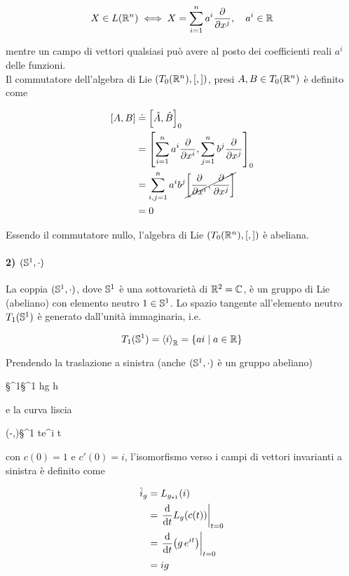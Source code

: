 \begin{equation}
	X \in L(\R^{n}) \iff X = \sum_{i=1}^{n} a^{i} \pdv{x^{j}} \qcomma a^{i} \in \R
\end{equation}

mentre un campo di vettori qualsiasi può avere al posto dei coefficienti reali $ a^{i} $ delle funzioni.\\
Il commutatore dell'algebra di Lie $ (T_{0}(\R^{n}),[,]) $, presi $ A,B \in T_{0}(\R^{n}) $ è definito come

\begin{align}
	\begin{split}
		\comm{A}{B} &\doteq \comm{\hat{A}}{\hat{B}}_{0}\\
		&= \comm{ \sum_{i=1}^{n} a^{i} \pdv{x^{i}} }{ \sum_{j=1}^{n} b^{j} \pdv{x^{j}} }_{0}\\
		&= \sum_{i,j=1}^{n} a^{i} b^{j} \cancel{ \comm{ \pdv{x^{i}} }{ \pdv{x^{j}} } }\\
		&= 0
	\end{split}
\end{align}

Essendo il commutatore nullo, l'algebra di Lie $ (T_{0}(\R^{n}),[,]) $ è abeliana.

\paragraph{2) $ (\S^{1},\cdot) $}

La coppia $ (\S^{1},\cdot) $, dove $ \S^{1} $ è una sottovarietà di $ \R^{2} = \C $, è un gruppo di Lie (abeliano) con elemento neutro $ 1 \in \S^{1} $. Lo spazio tangente all'elemento neutro $ T_{1}(\S^{1}) $ è generato dall'unità immaginaria, i.e.

\begin{equation}
	T_{1}(\S^{1}) = \ev{i}_{\R} = \{ a i \mid a \in \R \}
\end{equation}

Prendendo la traslazione a sinistra (anche $ (\S^{1},\cdot) $ è un gruppo abeliano)

%
	{\S^{1}}{\S^{1}}%
	{h}{g h}
	
e la curva liscia

%
	{(-\varepsilon,\varepsilon)}{\S^{1}}%
	{t}{e^{i t}}
	
con $ c(0) = 1 $ e $ c'(0) = i $, l'isomorfismo verso i campi di vettori invarianti a sinistra è definito come

\begin{align}
	\begin{split}
		\hat{i}_{g} &= L_{g_{*1}} (i)\\
		&= \eval{ \dv{t} L_{g}(c(t)) }_{t=0}\\
		&= \eval{ \dv{t} (g \, e^{i t}) }_{t=0}\\
		&= i g
	\end{split}
\end{align}

